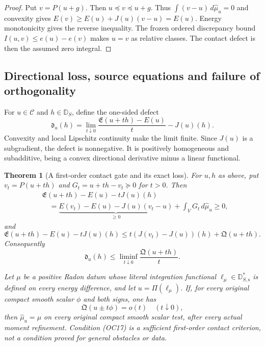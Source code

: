 \documentclass[11pt,a4paper]{article}
\numberwithin{equation}{section}
\newtheorem{theorem}{Theorem}[section]
\theoremstyle{definition}
\theoremstyle{remark}
\begin{document}
\begin{proof}
Put $v=P(u+g)$.  Then $u\preceq v\preceq u+g$.
Thus $\int(v-u)\,d\widehat\mu_u=0$ and convexity gives
$E(v)\ge E(u)+J(u)(v-u)=E(u)$.  Energy monotonicity gives
the reverse inequality.  The frozen ordered discrepancy bound
$I(u,v)\le e(u)-e(v)$ makes $u=v$ as relative classes.
The contact defect is then the assumed zero integral.
\end{proof}

\subsection{Directional loss, source equations and failure of orthogonality}

For $u\in\mathscr C$ and $h\in\mathbb D_S$, define the
one-sided defect
\[
 \mathfrak d_u(h)=
 \lim_{t\downarrow0}
       \frac{\mathfrak E(u+th)-E(u)}{t}-J(u)(h).
 \tag{OC13}
\]
Convexity and local Lipschitz continuity make the limit finite.
Since $J(u)$ is a subgradient, the defect is nonnegative.
It is positively homogeneous and subadditive, being a convex
directional derivative minus a linear functional.

\begin{theorem}[A first-order contact gate and its exact loss]
\label{thm:r12-first-order-contact-gate}
For $u,h$ as above, put $v_t=P(u+th)$ and
$G_t=u+th-v_t\succeq0$ for $t>0$.  Then
\[
 \begin{split}
 &\mathfrak E(u+th)-E(u)-tJ(u)(h)\\
 &\quad=
 \underbrace{E(v_t)-E(u)-J(u)(v_t-u)}_{\ge0}
                       +\int_VG_t\,d\widehat\mu_u\ge0,
 \end{split}
 \tag{OC14}
\]
and
\[
 \mathfrak E(u+th)-E(u)-tJ(u)(h)
       \le t(J(v_t)-J(u))(h)+\mathfrak Q(u+th).
 \tag{OC15}
\]
Consequently
\[
 \mathfrak d_u(h)
       \le\liminf_{t\downarrow0}\frac{\mathfrak Q(u+th)}{t}.
 \tag{OC16}
\]

Let $\mu$ be a positive Radon datum whose literal integration
functional $\ell_\mu\in\mathbb D_{S,\mathrm s}^*$ is defined
on every energy difference, and let $u=\Pi(\ell_\mu)$.
If, for every original compact smooth scalar $\phi$ and both
signs, one has
\[
                  \mathfrak Q(u\pm t\phi)=o(t)
                                     \quad(t\downarrow0),
 \tag{OC17}
\]
then $\widehat\mu_u=\mu$ on every original compact smooth
scalar test, after every actual moment refinement.
Condition \textup{(OC17)} is a sufficient first-order contact
criterion, not a condition proved for general obstacles or data.
\end{theorem}
\end{document}
